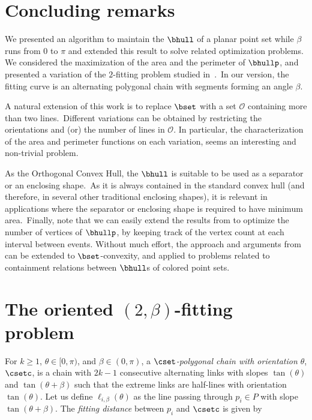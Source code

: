 \documentclass[11pt,letterpaper,english]{article}
\theoremstyle{definition}
\begin{document}
\section{Concluding remarks}\label{sec:conclusions}

We presented an algorithm to maintain the $\bhull$ of a planar point
set while $\beta$ runs from $0$ to $\pi$ and extended this result to
solve related optimization problems. We considered the maximization of
the area and the perimeter of $\bhullp$, and presented a variation of
the $2$-fitting problem studied in~\cite{fitting_2011}.~In our
version, the fitting curve is an alternating polygonal chain with
segments forming an angle $\beta$.


A natural extension of this work is to replace $\bset$ with a set
$\mathcal{O}$ containing more than two lines.~Different variations can
be obtained by restricting the orientations and (or) the number of
lines in $\mathcal{O}$. In particular, the characterization of the
area and perimeter functions on each variation, seems an interesting
and non-trivial problem.

As the Orthogonal Convex Hull, the $\bhull$ is suitable to be used as
a separator or an enclosing shape.~As it is always contained in the
standard convex hull (and therefore, in several other traditional
enclosing shapes), it is relevant in applications where the separator
or enclosing shape is required to have minimum area.~Finally, note
that we can easily extend the results from  to
optimize the number of vertices of $\bhullp$, by keeping track of the
vertex count at each interval between events. Without much effort, the
approach and arguments from \citet{alegria_2013} can be extended to
$\bset$-convexity, and applied to problems related to containment
relations between $\bhull$s of colored point sets.




\appendix
\renewcommand\thesection{Appendix \Alph{section}}

\section{The oriented $\left( 2,\beta \right)$-fitting problem}\label{sec:apps:fitting}



For $k \geq 1$, $\theta \in [0, \pi)$, and $\beta \in (0, \pi)$, a
\emph{$\cset$-polygonal chain with orientation $\theta$}, $\csetc$, is
a chain with $2k - 1$ consecutive alternating links with slopes
$\tan(\theta)$ and $\tan(\theta + \beta)$ such that the extreme links
are half-lines with orientation $\tan(\theta)$. Let us define
$\ell_{i,\beta}(\theta)$ as the line passing through $p_i \in P$ with
slope $\tan(\theta + \beta)$. The \emph{fitting distance} between
$p_i$ and $\csetc$ is given by
\end{document}
